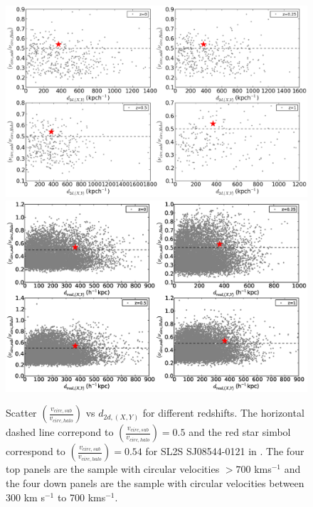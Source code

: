 \documentclass{emulateapj}
\begin{document}
\begin{figure}
\begin{center}
\includegraphics[width=1.0\textwidth]{Figures_eps/figure_7_2.eps}
\includegraphics[width=1.0\textwidth]{Figures_eps/figure_7_3.eps}
\end{center}
\caption{Scatter $\left(\frac{v_{circ,sub}}{v_{circ,halo}}\right)$
  vs $d_{2d,(X,Y)}$ for different redshifts. The  horizontal dashed
  line correpond to
  $\left(\frac{v_{circ,sub}}{v_{circ,halo}}\right)=0.5$ and the
  red star simbol correspond to
  $\left(\frac{v_{circ,sub}}{v_{circ,halo}}\right)=0.54$ for SL2S
  SJ08544-0121 in \citet{2013A&A...552A..80M}. The  four top panels
  are the sample with circular velocities $>700$ kms$^{-1}$ and the
  four down panels are the sample with  circular velocities between
  300 km s$^{-1}$ to 700 kms$^{-1}$.} 
\label{newparameter}
\end{figure}
\end{document}
